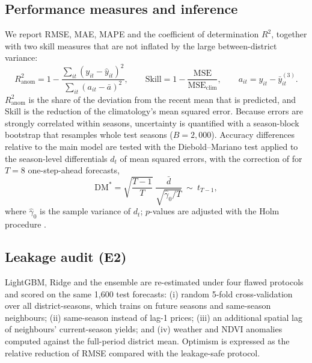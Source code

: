 \subsection{Performance measures and inference}\label{sec:metrics}
We report RMSE, MAE, MAPE and the coefficient of determination $R^2$, together with two skill measures that are not inflated by the large between-district variance:
\begin{equation}\label{eq:skill}
R^2_{\mathrm{anom}} = 1-\frac{\sum_{it}(y_{it}-\hat y_{it})^2}{\sum_{it}(a_{it}-\bar a)^2},\qquad
\mathrm{Skill} = 1-\frac{\mathrm{MSE}}{\mathrm{MSE}_{\mathrm{clim}}},\qquad a_{it}=y_{it}-\bar y^{(3)}_{it}.
\end{equation}
$R^2_{\mathrm{anom}}$ is the share of the deviation from the recent mean that is predicted, and Skill is the reduction of the climatology's mean squared error. Because errors are strongly correlated within seasons, uncertainty is quantified with a season-block bootstrap that resamples whole test seasons \citep{kunsch1989jackknife,efron1993introduction} ($B=2{,}000$). Accuracy differences relative to the main model are tested with the Diebold--Mariano test \citep{diebold1995comparing} applied to the season-level differentials $d_t$ of mean squared errors, with the correction of \citet{harvey1997testing} for $T=8$ one-step-ahead forecasts,
\begin{equation}\label{eq:dm}
\mathrm{DM}^{*}=\sqrt{\frac{T-1}{T}}\;\frac{\bar d}{\sqrt{\hat\gamma_0/T}}\ \sim\ t_{T-1},
\end{equation}
where $\hat\gamma_0$ is the sample variance of $d_t$; $p$-values are adjusted with the Holm procedure \citep{holm1979simple}.

\subsection{Leakage audit (E2)}\label{sec:leakmethods}
LightGBM, Ridge and the ensemble are re-estimated under four flawed protocols and scored on the same 1{,}600 test forecasts: (i) random 5-fold cross-validation over all district-seasons, which trains on future seasons and same-season neighbours; (ii) same-season instead of lag-1 prices; (iii) an additional spatial lag of neighbours' current-season yields; and (iv) weather and NDVI anomalies computed against the full-period district mean. Optimism is expressed as the relative reduction of RMSE compared with the leakage-safe protocol.

